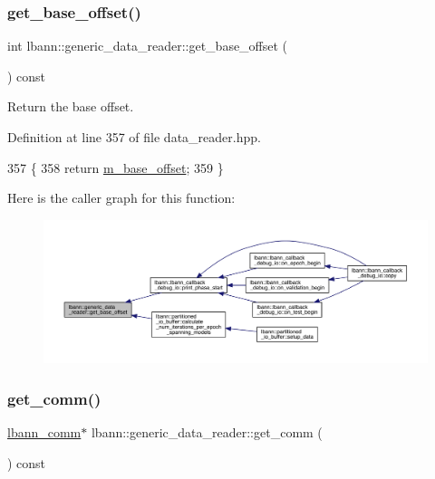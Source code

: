 \subsubsection{\texorpdfstring{get\+\_\+base\+\_\+offset()}{get\_base\_offset()}}
{\footnotesize\ttfamily int lbann\+::generic\+\_\+data\+\_\+reader\+::get\+\_\+base\+\_\+offset (\begin{DoxyParamCaption}{ }\end{DoxyParamCaption}) const\hspace{0.3cm}{\ttfamily [inline]}}



Return the base offset. 



Definition at line 357 of file data\+\_\+reader.\+hpp.


\begin{DoxyCode}
357                               \{
358     \textcolor{keywordflow}{return} \hyperlink{classlbann_1_1generic__data__reader_a77946c4dca753c23f39e9a490eba1229}{m\_base\_offset};
359   \}
\end{DoxyCode}
Here is the caller graph for this function\+:\nopagebreak
\begin{figure}[H]
\begin{center}
\leavevmode
\includegraphics[width=350pt]{classlbann_1_1generic__data__reader_a65b9d39e7585ec325eb40a123cd70891_icgraph}
\end{center}
\end{figure}
\mbox{\label{classlbann_1_1generic__data__reader_aedca18323a7777180fc12d73d809fb84}} 
\subsubsection{\texorpdfstring{get\+\_\+comm()}{get\_comm()}}
{\footnotesize\ttfamily \hyperlink{classlbann_1_1lbann__comm}{lbann\+\_\+comm}$\ast$ lbann\+::generic\+\_\+data\+\_\+reader\+::get\+\_\+comm (\begin{DoxyParamCaption}{ }\end{DoxyParamCaption}) const\hspace{0.3cm}{\ttfamily [inline]}}



